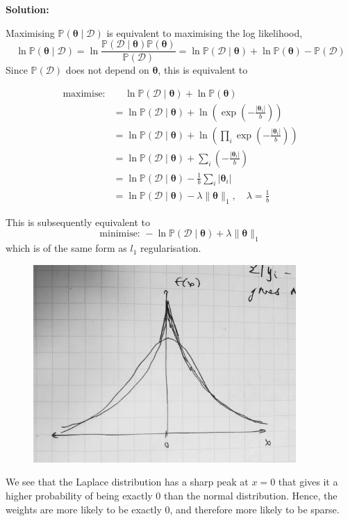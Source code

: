 \documentclass[letter,11pt]{article}
\newenvironment{solution}{
    \vspace{0.16in} {\bf Solution:}
    
}{
	\vspace{0.16in}
}
\newcommand{\thetab}{\bm{\theta}}
\newcommand{\PP}{\mathbb{P}}
\newcommand{\Dc}{\mathcal{D}}
\begin{document}
\begin{enumerate}
    \begin{solution}
        Maximising $\PP(\thetab \mid \Dc)$ is equivalent to maximising the log likelihood, \[\ln \PP(\thetab \mid \Dc) = \ln \frac{\PP(\Dc \mid \thetab) \PP(\thetab)}{\PP(\Dc)} = \ln \PP(\Dc \mid \thetab) + \ln \PP(\thetab) - \PP(\Dc)\] Since $\PP(\Dc)$ does not depend on $\thetab$, this is equivalent to

        \begin{align*}
            \text{maximise:}& \quad\, \ln \PP(\Dc \mid \thetab) + \ln \PP(\thetab) \\
                &= \ln \PP(\Dc \mid \thetab) + \ln \left( \exp\left(-\frac{|\thetab_i|}{b}\right) \right) \\
                &= \ln \PP(\Dc \mid \thetab) + \ln \left(\prod_i \exp\left(-\frac{|\thetab_i|}{b}\right) \right) \\
                &= \ln \PP(\Dc \mid \thetab) + \sum_i \left(-\frac{|\thetab_i|}{b}\right) \\
                &= \ln \PP(\Dc \mid \thetab) - \frac{1}{b} \sum_i |\thetab_i| \\
                &= \ln \PP(\Dc \mid \thetab) - \lambda \|\thetab\|_1, \quad \lambda = \frac{1}{b}
        \end{align*}

        This is subsequently equivalent to \[\text{minimise: } -\ln \PP(\Dc \mid \thetab) + \lambda \|\thetab\|_1\] which is of the same form as $l_1$ regularisation.

        \begin{figure}[H]
            \centering
            \includegraphics[width=10cm]{q3.jpg}
        \end{figure}

        We see that the Laplace distribution has a sharp peak at $x = 0$ that gives it a higher probability of being exactly 0 than the normal distribution. Hence, the weights are more likely to be exactly 0, and therefore more likely to be sparse.
    \end{solution}

\end{enumerate}
\end{document}
